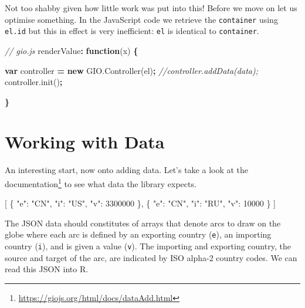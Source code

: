 \documentclass[
]{krantz}
\makeatletter
\newenvironment{Shaded}{\begin{snugshade}}{\end{snugshade}}
\newcommand{\AttributeTok}[1]{\textcolor[rgb]{0.61,0.61,0.61}{#1}}
\newcommand{\CommentTok}[1]{\textcolor[rgb]{0.37,0.37,0.37}{\textit{#1}}}
\newcommand{\DataTypeTok}[1]{\textcolor[rgb]{0.27,0.27,0.27}{#1}}
\newcommand{\DecValTok}[1]{\textcolor[rgb]{0.06,0.06,0.06}{#1}}
\newcommand{\FunctionTok}[1]{\textcolor[rgb]{0,0,0}{#1}}
\newcommand{\KeywordTok}[1]{\textcolor[rgb]{0.27,0.27,0.27}{\textbf{#1}}}
\newcommand{\NormalTok}[1]{#1}
\newcommand{\OperatorTok}[1]{\textcolor[rgb]{0.43,0.43,0.43}{\textbf{#1}}}
\newcommand{\OtherTok}[1]{\textcolor[rgb]{0.37,0.37,0.37}{#1}}
\newcommand{\StringTok}[1]{\textcolor[rgb]{0.5,0.5,0.5}{#1}}
\newcommand{\VariableTok}[1]{\textcolor[rgb]{0,0,0}{#1}}
\renewcommand{\href}[2]{#2\footnote{\url{#1}}}
\newenvironment{kframe}{%
\medskip{}
\setlength{\fboxsep}{.8em}
 \def\at@end@of@kframe{}%
 \ifinner\ifhmode%
  \def\at@end@of@kframe{\end{minipage}}%
  \begin{minipage}{\columnwidth}%
 \fi\fi%
 \def\FrameCommand##1{\hskip\@totalleftmargin \hskip-\fboxsep
 \colorbox{shadecolor}{##1}\hskip-\fboxsep
     \hskip-\linewidth \hskip-\@totalleftmargin \hskip\columnwidth}%
 \MakeFramed {\advance\hsize-\width
   \@totalleftmargin\z@ \linewidth\hsize
   \@setminipage}}%
 {\par\unskip\endMakeFramed%
 \at@end@of@kframe}
\renewenvironment{Shaded}{\begin{kframe}}{\end{kframe}}
\makeatother
\begin{document}
Not too shabby given how little work was put into this! Before we move on let us optimise something. In the JavaScript code we retrieve the \texttt{container} using \texttt{el.id} but this in effect is very inefficient: \texttt{el} is identical to \texttt{container}.

\begin{Shaded}
\begin{Highlighting}[]
\CommentTok{// gio.js}
\NormalTok{renderValue}\OperatorTok{:} \KeywordTok{function}\NormalTok{(x) }\OperatorTok{\{}

  \KeywordTok{var}\NormalTok{ controller }\OperatorTok{=} \KeywordTok{new} \VariableTok{GIO}\NormalTok{.}\AttributeTok{Controller}\NormalTok{(el)}\OperatorTok{;}
  \CommentTok{//controller.addData(data);}
  \VariableTok{controller}\NormalTok{.}\AttributeTok{init}\NormalTok{()}\OperatorTok{;}

\OperatorTok{\}}
\end{Highlighting}
\end{Shaded}

\hypertarget{widgets-full-data}{%
\section{Working with Data}\label{widgets-full-data}}

An interesting start, now onto adding data. Let's take a look at the \href{https://giojs.org/html/docs/dataAdd.html}{documentation} to see what data the library expects.

\begin{Shaded}
\begin{Highlighting}[]
\OtherTok{[}
  \FunctionTok{\{}
    \DataTypeTok{"e"}\FunctionTok{:} \StringTok{"CN"}\FunctionTok{,}
    \DataTypeTok{"i"}\FunctionTok{:} \StringTok{"US"}\FunctionTok{,}
    \DataTypeTok{"v"}\FunctionTok{:} \DecValTok{3300000}
  \FunctionTok{\}}\OtherTok{,}
  \FunctionTok{\{}
    \DataTypeTok{"e"}\FunctionTok{:} \StringTok{"CN"}\FunctionTok{,}
    \DataTypeTok{"i"}\FunctionTok{:} \StringTok{"RU"}\FunctionTok{,}
    \DataTypeTok{"v"}\FunctionTok{:} \DecValTok{10000}
  \FunctionTok{\}}
\OtherTok{]}
\end{Highlighting}
\end{Shaded}

The JSON data should constitutes of arrays that denote arcs to draw on the globe where each arc is defined by an exporting country (\texttt{e}), an importing country (\texttt{i}), and is given a value (\texttt{v}). The importing and exporting country, the source and target of the arc, are indicated by ISO alpha-2 country codes. We can read this JSON into R.
\end{document}
